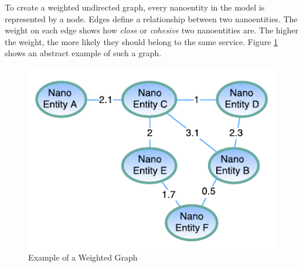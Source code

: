 \begin{minipage}[t]{0.6\textwidth}
	\setlength{\parskip}{5pt plus 0.1pt}	
	To create a weighted undirected graph, every nanoentity in the model is represented by a node. Edges define a relationship between two nanoentities. The weight on each edge shows how \textit{close} or \textit{cohesive} two nanoentities are. The higher the weight, the more likely they should belong to the same service. Figure \ref{fig:weighted_graph} shows an abstract example of such a graph.
\end{minipage}
\begin{minipage}[t]{0.4\textwidth}
	
	
	\begin{figure}[H]
		\includegraphics[scale=0.8]{diagrams/weighted_graph.pdf}
		\caption{Example of a Weighted Graph}
		\label{fig:weighted_graph}
	\end{figure}
	
\end{minipage}


